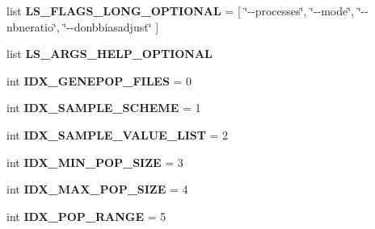 \begin{DoxyCompactItemize}
\item 
list {\bfseries L\+S\+\_\+\+F\+L\+A\+G\+S\+\_\+\+L\+O\+N\+G\+\_\+\+O\+P\+T\+I\+O\+N\+AL} = \mbox{[} \char`\"{}-\/-\/processes\char`\"{}, \char`\"{}-\/-\/mode\char`\"{}, \char`\"{}-\/-\/nbneratio\char`\"{}, \char`\"{}-\/-\/donbbiasadjust\char`\"{} \mbox{]}\hypertarget{namespacenegui_1_1pgdriveneestimator_ae135a1fb66d7c2ac6a85b5f1a515e918}{}\label{namespacenegui_1_1pgdriveneestimator_ae135a1fb66d7c2ac6a85b5f1a515e918}

\item 
list {\bfseries L\+S\+\_\+\+A\+R\+G\+S\+\_\+\+H\+E\+L\+P\+\_\+\+O\+P\+T\+I\+O\+N\+AL}
\item 
int {\bfseries I\+D\+X\+\_\+\+G\+E\+N\+E\+P\+O\+P\+\_\+\+F\+I\+L\+ES} = 0\hypertarget{namespacenegui_1_1pgdriveneestimator_ab0e9eab0cba1678dbe8702c8638b22b2}{}\label{namespacenegui_1_1pgdriveneestimator_ab0e9eab0cba1678dbe8702c8638b22b2}

\item 
int {\bfseries I\+D\+X\+\_\+\+S\+A\+M\+P\+L\+E\+\_\+\+S\+C\+H\+E\+ME} = 1\hypertarget{namespacenegui_1_1pgdriveneestimator_a31f8fcb68429a538163ab80b51c4ce8a}{}\label{namespacenegui_1_1pgdriveneestimator_a31f8fcb68429a538163ab80b51c4ce8a}

\item 
int {\bfseries I\+D\+X\+\_\+\+S\+A\+M\+P\+L\+E\+\_\+\+V\+A\+L\+U\+E\+\_\+\+L\+I\+ST} = 2\hypertarget{namespacenegui_1_1pgdriveneestimator_ad1fbe668ed6bb196e7247ae8d6358c92}{}\label{namespacenegui_1_1pgdriveneestimator_ad1fbe668ed6bb196e7247ae8d6358c92}

\item 
int {\bfseries I\+D\+X\+\_\+\+M\+I\+N\+\_\+\+P\+O\+P\+\_\+\+S\+I\+ZE} = 3\hypertarget{namespacenegui_1_1pgdriveneestimator_a0f7b02c2dab3acd91ba217a6cbdef4d8}{}\label{namespacenegui_1_1pgdriveneestimator_a0f7b02c2dab3acd91ba217a6cbdef4d8}

\item 
int {\bfseries I\+D\+X\+\_\+\+M\+A\+X\+\_\+\+P\+O\+P\+\_\+\+S\+I\+ZE} = 4\hypertarget{namespacenegui_1_1pgdriveneestimator_a3a779c3b4f3e5fd8db0224fd3fbdeba7}{}\label{namespacenegui_1_1pgdriveneestimator_a3a779c3b4f3e5fd8db0224fd3fbdeba7}

\item 
int {\bfseries I\+D\+X\+\_\+\+P\+O\+P\+\_\+\+R\+A\+N\+GE} = 5\hypertarget{namespacenegui_1_1pgdriveneestimator_a488e146036273d300b7f528cf22ad017}{}\label{namespacenegui_1_1pgdriveneestimator_a488e146036273d300b7f528cf22ad017}


\end{DoxyCompactItemize}
